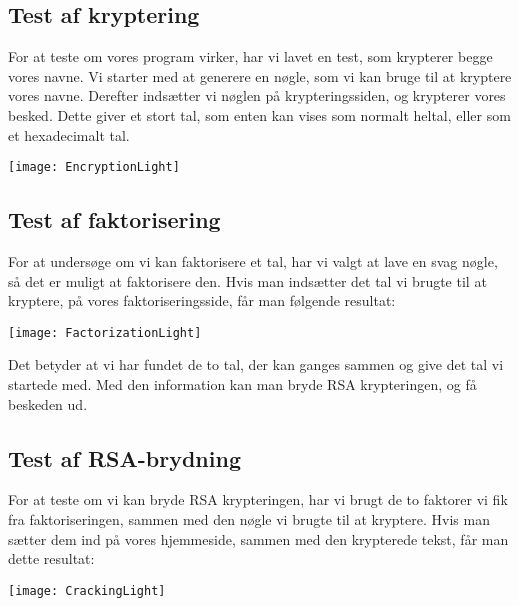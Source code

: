 \documentclass[a4paper,12pt]{extarticle}
\begin{document}
    \subsection{Test af kryptering}\label{subsec:testing-encryption}
    For at teste om vores program virker, har vi lavet en test, som krypterer begge vores navne.
    Vi starter med at generere en nøgle, som vi kan bruge til at kryptere vores navne.
    Derefter indsætter vi nøglen på krypteringssiden, og krypterer vores besked.
    Dette giver et stort tal, som enten kan vises som normalt heltal, eller som et hexadecimalt tal.

    \begin{center}
        \texttt{[image: EncryptionLight]}\label{img:encryption}  %
    \end{center}

    \subsection{Test af faktorisering}\label{subsec:testing-factorization}
    For at undersøge om vi kan faktorisere et tal, har vi valgt at lave en svag nøgle,
    så det er muligt at faktorisere den.
    Hvis man indsætter det tal vi brugte til at kryptere, på vores faktoriseringsside, får man følgende resultat:

    \begin{center}
        \texttt{[image: FactorizationLight]}\label{img:factorization}  %
    \end{center}

    Det betyder at vi har fundet de to tal, der kan ganges sammen og give det tal vi startede med.
    Med den information kan man bryde RSA krypteringen, og få beskeden ud.

    \subsection{Test af RSA-brydning}\label{subsec:testing-cracking}
    For at teste om vi kan bryde RSA krypteringen, har vi brugt de to faktorer vi fik fra faktoriseringen,
    sammen med den nøgle vi brugte til at kryptere.
    Hvis man sætter dem ind på vores hjemmeside, sammen med den krypterede tekst, får man dette resultat:

    \begin{center}
        \texttt{[image: CrackingLight]}\label{img:cracking}  %
    \end{center}
\end{document}
